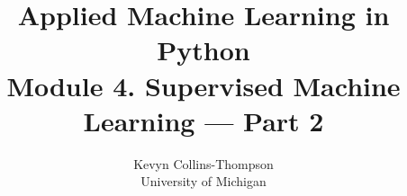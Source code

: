 \documentclass[a4paper,11pt]{article} %
\author{Kevyn Collins-Thompson\\University of Michigan}
\title{Applied Machine Learning in Python\\Module 4. Supervised Machine Learning --- Part 2}
\date{}
\begin{document}

\maketitle

\tableofcontents

\vspace{1cm}

\begin{multicols}{2}





%

%

%

%

%

\end{multicols}
\end{document}
